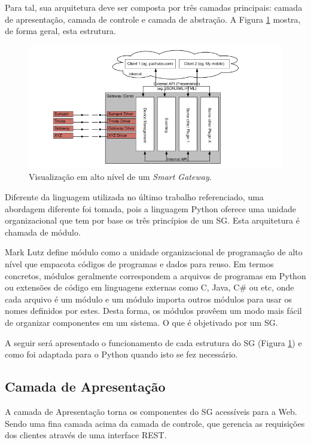 \documentclass[12pt,a4paper,oneside]{report}
\begin{document}
Para tal, sua arquitetura deve ser composta por três camadas principais: camada de apresentação, camada de controle e camada de abstração. A Figura \ref{fig:estrutura-sg} mostra, de forma geral, esta estrutura.

\begin{figure}[htbp]
   \centering
    \includegraphics[width=1\textwidth]{figuras/figura_2_8}
    \caption{Visualização em alto nível de um \emph{Smart Gateway}.}
    \label{fig:estrutura-sg}
\end{figure}

Diferente da linguagem utilizada no último trabalho referenciado, uma abordagem diferente foi tomada, pois a linguagem Python oferece uma unidade organizacional que tem por base os três princípios de um SG. Esta arquitetura é chamada de módulo.

Mark Lutz \cite{python} define módulo como a unidade organizacional de programação de alto nível que empacota códigos de programas e dados para reuso. Em termos concretos, módulos geralmente correspondem a arquivos de programas em Python ou extensões de código em linguagens externas como C, Java, C\# ou etc, onde cada arquivo é um módulo e um módulo importa outros módulos para usar os nomes definidos por estes. Desta forma, os módulos provêem um modo mais fácil de organizar componentes em um sistema. O que é objetivado por um SG.

A seguir será apresentado o funcionamento de cada estrutura do SG (Figura \ref{fig:estrutura-sg}) e como foi adaptada para o Python quando isto se fez necessário.

\subsection{Camada de Apresentação}

A camada de Apresentação torna os componentes do SG acessíveis para a Web. Sendo uma fina camada acima da camada de controle, que gerencia as requisições dos clientes através de uma interface REST.
\end{document}
